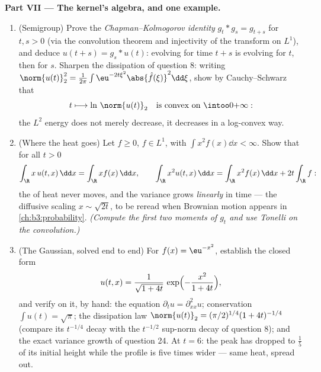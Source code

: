 \begin{problem}[{Weekend problem --- $\partial_tu =
\partial^2_{xx}u$, solved end to end}]
\medskip
\noindent\textbf{Part VII --- The kernel's algebra, and one
 example.}
\begin{enumerate}[resume]
  \item (Semigroup) Prove the \emph{Chapman--Kolmogorov
        identity} $g_t * g_s = g_{t+s}$ for $t, s > 0$ (via
        the convolution theorem and injectivity of the
        transform on $L^1$), and deduce $u(t + s) = g_s *
        u(t)$: evolving for time $t + s$ is evolving for $t$,
        then for $s$. Sharpen the dissipation of question 8:
        writing $\norm{u(t)}_2^2 = \frac1{2\pi}\int
        \eu^{-2t\xi^2}\abs{\hat f(\xi)}^2\dd\xi$, show by
        Cauchy--Schwarz that
        \[
        t \longmapsto \ln\,\norm{u(t)}_2
        \quad\text{is convex on } \intoo0{+\infty} :
        \]
        the $L^2$ energy does not merely decrease, it
        decreases in a log-convex way.
  \item (Where the heat goes) Let $f \geq 0$, $f \in L^1$,
        with $\int x^2f(x)\dd x < \infty$. Show that for all
        $t > 0$
        \[
        \int_\R x\,u(t, x)\,\dd x = \int_\R x f(x)\,\dd x,
        \qquad
        \int_\R x^2u(t, x)\,\dd x
        = \int_\R x^2f(x)\,\dd x + 2t\int_\R f :
        \]
        the  of heat never moves, and the variance
        grows \emph{linearly} in time --- the diffusive
        scaling $x \sim \sqrt{2t}$, to be reread when
        Brownian motion appears in \cref{ch:b3:probability}.
        \emph{(Compute the first two moments of $g_t$ and use
        Tonelli on the convolution.)}
  \item (The Gaussian, solved end to end) For $f(x) =
        \eu^{-x^2}$, establish the closed form
        \[
        u(t, x) = \frac1{\sqrt{1 + 4t}}\,
        \exp\Bigl(-\frac{x^2}{1 + 4t}\Bigr),
        \]
        and verify on it, by hand: the equation $\partial_tu
        = \partial^2_{xx}u$; conservation $\int u(t) =
        \sqrt\pi$; the dissipation law $\norm{u(t)}_2 =
        (\pi/2)^{1/4}(1 + 4t)^{-1/4}$ (compare its $t^{-1/4}$
        decay with the $t^{-1/2}$ sup-norm decay of question
        8); and the exact variance growth of question 24. At
        $t = 6$: the peak has dropped to $\frac15$ of its
        initial height while the profile is five times wider
        --- same heat, spread out.
\end{enumerate}
\end{problem}
